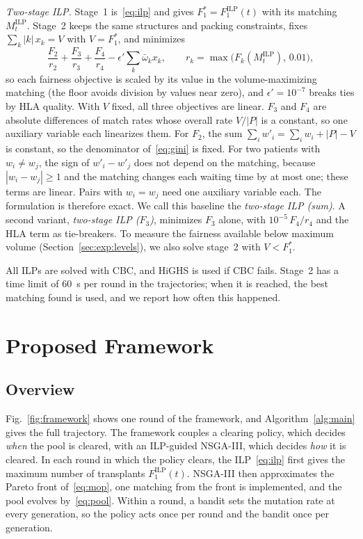 \documentclass[journal]{IEEEtran}
\newcommand{\ilp}{\ensuremath{\mathrm{ILP}}}
\begin{document}
\emph{Two-stage ILP.} Stage~1 is~\eqref{eq:ilp} and gives
$F_1^{*} = F_1^{\ilp}(t)$ with its matching $M^{\ilp}_t$. Stage~2 keeps
the same structures and packing constraints, fixes
$\sum_k |k|\, x_k = V$ with $V = F_1^{*}$, and minimizes
\begin{equation}
  \frac{F_2}{r_2} + \frac{F_3}{r_3} + \frac{F_4}{r_4}
  - \epsilon' \sum_k \bar\omega_k x_k ,
  \qquad r_k = \max\bigl(F_k(M^{\ilp}_t),\, 0.01\bigr) ,
  \label{eq:twostage}
\end{equation}
so each fairness objective is scaled by its value in the
volume-maximizing matching (the floor avoids division by values near
zero), and $\epsilon' = 10^{-7}$ breaks ties by HLA quality. With $V$
fixed, all three objectives are linear. $F_3$ and $F_4$ are absolute
differences of match rates whose overall rate $V/|P|$ is a constant,
so one auxiliary variable each linearizes them. For $F_2$, the sum
$\sum_i w'_i = \sum_i w_i + |P| - V$ is constant, so the denominator
of~\eqref{eq:gini} is fixed. For two patients with $w_i \neq w_j$, the
sign of $w'_i - w'_j$ does not depend on the matching, because
$|w_i - w_j| \geq 1$ and the matching changes each waiting time by at
most one; these terms are linear. Pairs with $w_i = w_j$ need one
auxiliary variable each. The formulation is therefore exact. We call
this baseline the \emph{two-stage ILP (sum)}. A second variant,
\emph{two-stage ILP ($F_3$)}, minimizes $F_3$ alone, with
$10^{-5}\, F_4/r_4$ and the HLA term as tie-breakers. To measure the
fairness available below maximum volume (Section~\ref{sec:exp:levels}),
we also solve stage~2 with $V < F_1^{*}$.

All ILPs are solved with CBC, and HiGHS is used if CBC fails. Stage~2
has a time limit of 60~s per round in the trajectories; when it is
reached, the best matching found is used, and we report how often this
happened.

\section{Proposed Framework}
\label{sec:method}

\subsection{Overview}
\label{sec:method:overview}

Fig.~\ref{fig:framework} shows one round of the framework, and
Algorithm~\ref{alg:main} gives the full trajectory. The framework
couples a clearing policy, which decides \emph{when} the pool is
cleared, with an ILP-guided NSGA-III, which decides \emph{how} it is
cleared. In each round in which the policy clears, the
ILP~\eqref{eq:ilp} first gives the maximum number of transplants
$F_1^{\mathrm{ILP}}(t)$. NSGA-III then approximates the Pareto front
of~\eqref{eq:mop}, one matching from the front is implemented, and the
pool evolves by~\eqref{eq:pool}. Within a round, a bandit sets the
mutation rate at every generation, so the policy acts once per round
and the bandit once per generation.
\end{document}
